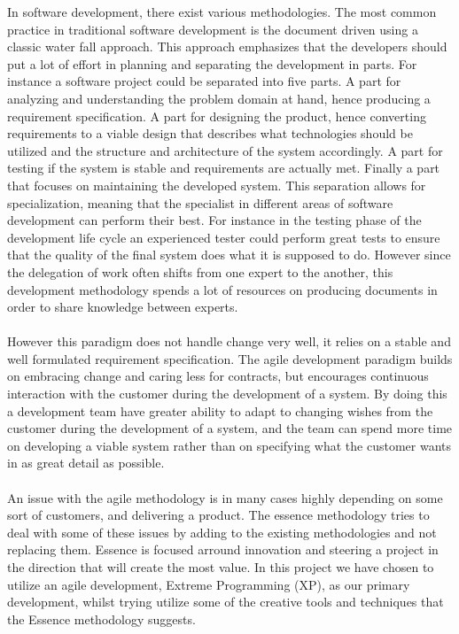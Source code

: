 In software development, there exist various methodologies. The most common practice in traditional software development is the document driven using a classic water fall approach. This approach emphasizes that the developers should put a lot of effort in planning and separating the development in parts. For instance a software project could be separated into five parts. A part for analyzing and understanding the problem domain at hand, hence producing a requirement specification. A part for designing the product, hence converting requirements to a viable design that describes what technologies should be utilized and the structure and architecture of the system accordingly. A part for testing if the system is stable and requirements are actually met. Finally a part that focuses on maintaining the developed system. This separation allows for specialization, meaning that the specialist in different areas of software development can perform their best. For instance in the testing phase of the development life cycle an experienced tester could perform great tests to ensure that the quality of the final system does what it is supposed to do. However since the delegation of work often shifts from one expert to the another, this development methodology spends a lot of resources on producing documents in order to share knowledge between experts. 
\\\\
However this paradigm does not handle change very well, it relies on a stable and well formulated requirement specification. The agile development paradigm builds on embracing change and caring less for contracts, but encourages continuous interaction with the customer during the development of a system. By doing this a development team have greater ability to adapt to changing wishes from the customer during the development of a system, and the team can spend more time on developing a viable system rather than on specifying what the customer wants in as great detail as possible.
\\\\
An issue with the agile methodology is in many cases highly depending on some sort of customers, and delivering a product. The essence methodology tries to deal with some of these issues by adding to the existing methodologies and not replacing them. Essence is focused arround innovation and steering a project in the direction that will create the most value. In this project we have chosen to utilize an agile development, Extreme Programming (XP), as our primary development, whilst trying utilize some of the creative tools and techniques that the Essence methodology suggests. 





